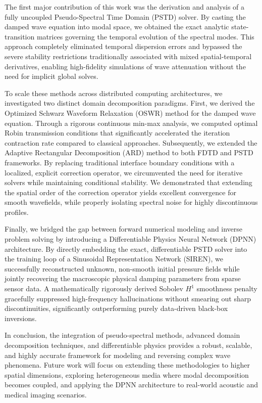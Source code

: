 \documentclass{Configuration_Files/PoliMi3i_thesis}
\begin{document}
The first major contribution of this work was the derivation and analysis of a fully uncoupled Pseudo-Spectral Time Domain (PSTD) solver. By casting the damped wave equation into modal space, we obtained the exact analytic state-transition matrices governing the temporal evolution of the spectral modes. This approach completely eliminated temporal dispersion errors and bypassed the severe stability restrictions traditionally associated with mixed spatial-temporal derivatives, enabling high-fidelity simulations of wave attenuation without the need for implicit global solves.

To scale these methods across distributed computing architectures, we investigated two distinct domain decomposition paradigms. First, we derived the Optimized Schwarz Waveform Relaxation (OSWR) method for the damped wave equation. Through a rigorous continuous min-max analysis, we computed optimal Robin transmission conditions that significantly accelerated the iteration contraction rate compared to classical approaches. Subsequently, we extended the Adaptive Rectangular Decomposition (ARD) method to both FDTD and PSTD frameworks. By replacing traditional interface boundary conditions with a localized, explicit correction operator, we circumvented the need for iterative solvers while maintaining conditional stability. We demonstrated that extending the spatial order of the correction operator yields excellent convergence for smooth wavefields, while properly isolating spectral noise for highly discontinuous profiles.

Finally, we bridged the gap between forward numerical modeling and inverse problem solving by introducing a Differentiable Physics Neural Network (DPNN) architecture. By directly embedding the exact, differentiable PSTD solver into the training loop of a Sinusoidal Representation Network (SIREN), we successfully reconstructed unknown, non-smooth initial pressure fields while jointly recovering the macroscopic physical damping parameters from sparse sensor data. A mathematically rigorously derived Sobolev $H^1$ smoothness penalty gracefully suppressed high-frequency hallucinations without smearing out sharp discontinuities, significantly outperforming purely data-driven black-box inversions.

In conclusion, the integration of pseudo-spectral methods, advanced domain decomposition techniques, and differentiable physics provides a robust, scalable, and highly accurate framework for modeling and reversing complex wave phenomena. Future work will focus on extending these methodologies to higher spatial dimensions, exploring heterogeneous media where modal decomposition becomes coupled, and applying the DPNN architecture to real-world acoustic and medical imaging scenarios.
\end{document}
